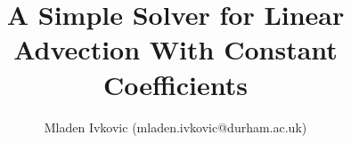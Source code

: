 



\title{A Simple Solver for Linear Advection With Constant Coefficients}
\author{Mladen Ivkovic (mladen.ivkovic@durham.ac.uk)}
\date{}







\maketitle
\tableofcontents
\newpage


% 






